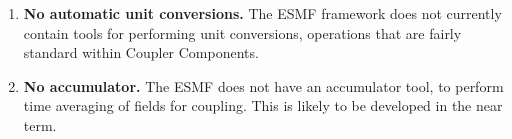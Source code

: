 %


\begin{enumerate}

\item {\bf No automatic unit conversions.}  The ESMF framework does not currently 
contain tools for performing unit conversions, operations that are fairly 
standard within Coupler Components.

\item {\bf No accumulator.}  The ESMF does not have an accumulator tool, to
perform time averaging of fields for coupling.  This is likely to be developed
in the near term.

\end{enumerate}
